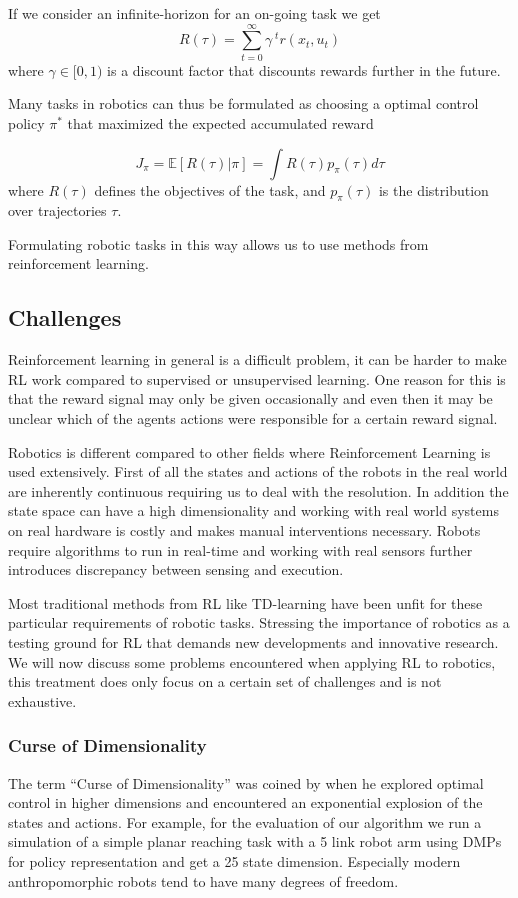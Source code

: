 If we consider an infinite-horizon for an on-going task we get
$$ R(\tau) = \sum^{\infty}_{t=0} \gamma^{\; t} r(x_t, u_t) $$
where $\gamma \in [0,1)$ is a discount factor that discounts rewards further in the future.

Many tasks in robotics can thus be formulated as choosing a optimal control
policy $\pi^*$ that maximized the expected accumulated reward

$$ J_{\pi} = \mathbb{E}[R(\tau) | \pi] = \int R(\tau) p_{\pi}(\tau) d\tau $$
where $R(\tau)$ defines the objectives of the task, and $p_{\pi}(\tau)$ is the
distribution over trajectories $\tau$.

Formulating robotic tasks in this way allows us to use methods from
reinforcement learning. 

\subsection{Challenges}
Reinforcement learning in general is a difficult problem, it can be harder
to make RL work compared to supervised or unsupervised learning. One reason
for this is that the reward signal may only be given occasionally and
even then it may be unclear which of
the agents actions were responsible for a certain
reward signal. 

Robotics is different compared to other fields where Reinforcement Learning
is used extensively. First of all the states and actions of the robots in the
real world are inherently continuous requiring us to
deal with the resolution.
In addition the state space can have a high dimensionality and
working with real world systems on real hardware is costly and
makes manual interventions necessary.
Robots require algorithms to run in real-time and working with
real sensors further introduces discrepancy between sensing and
execution.

Most traditional methods from RL like
TD-learning \cite{sutton2018reinforcement}
have been unfit for these particular requirements of robotic tasks.
Stressing the importance of robotics as a testing ground for RL that
demands new developments and innovative research.
We will now discuss some problems encountered when applying
RL to robotics, this treatment does only focus on a certain
set of challenges and is not exhaustive.

\subsubsection{Curse of Dimensionality}
The term ``Curse of Dimensionality'' was coined by \citet{Bellman:1957} when
he explored optimal control in higher dimensions and encountered
an exponential explosion of the states and actions.
For example, for the evaluation of our algorithm we run a simulation of a
simple planar reaching task
with a 5 link robot arm using DMPs
for policy representation and get a 25 state dimension.
Especially modern anthropomorphic robots tend to have many degrees of
freedom.

